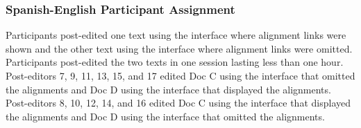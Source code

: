 



\subsubsection{Spanish-English Participant Assignment}

Participants post-edited one text using the interface where alignment links were shown and the other text using the interface where alignment links were omitted. 
%
Participants post-edited the two texts in one session lasting less than one hour. 
%
Post-editors 7, 9, 11, 13, 15, and 17 edited Doc C using the interface that omitted the alignments and Doc D using the interface that displayed the alignments. 
%
Post-editors 8, 10, 12, 14, and 16 edited Doc C using the interface that displayed the alignments and Doc D using the interface that omitted the alignments.







